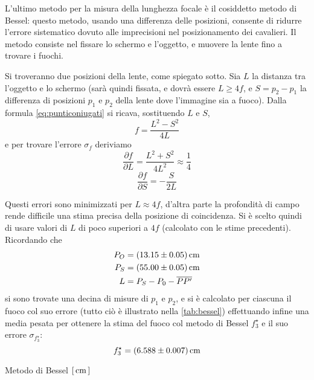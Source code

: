 L'ultimo metodo per la misura della lunghezza focale è il cosiddetto 
metodo di Bessel: questo metodo, usando una differenza delle 
posizioni, consente di ridurre l'errore sistematico dovuto alle 
imprecisioni nel posizionamento dei cavalieri. Il metodo consiste 
nel fissare lo schermo e l'oggetto, e muovere la lente fino a 
trovare i fuochi. 

Si troveranno due posizioni della lente, come spiegato sotto. Sia 
$L$ la distanza tra l'oggetto e lo schermo (sarà quindi fissata, e 
dovrà essere $L \geq 4f$, e $S=p_2-p_1$ la differenza di posizioni $p_1$ e $p_2$ della 
lente dove l'immagine sia a fuoco).  Dalla formula \eqref{eq:punticoniugati} si ricava, 
sostituendo $L$ e $S$,
\begin{equation}
f = \frac{L^2-S^2}{4L}
\end{equation}
e per trovare l'errore $\sigma_f$ deriviamo
\begin{equation*} \label{eq:dfdl}
\frac{\partial f}{\partial L} = \frac{L^2+S^2}{4L^2} \approx \frac{1}{4}
\end{equation*}
\begin{equation*}
\frac{\partial f}{\partial S} = -\frac{S}{2L}
\end{equation*}

Questi errori sono minimizzati per $L \approx 4f$, d'altra parte la 
profondità di campo rende difficile una stima precisa della 
posizione di coincidenza. Si \`e scelto quindi di usare valori di $L$ di poco 
superiori a $4f$ (calcolato con le stime precedenti). 
Ricordando che
\begin{align}
	 P_O &= (13.15 \pm 0.05)\,\mathrm{cm} \\
	 P_S &= (55.00 \pm 0.05)\,\mathrm{cm} \\
	 L &= P_S -P_0 -\overline{PP'}
\end{align}
si sono trovate una decina di misure di $p_1$ e 
$p_2$, e si \`e calcolato per ciascuna il fuoco col suo errore 
(tutto ciò è illustrato nella \autoref{tab:bessel}) effettuando 
infine una media pesata per ottenere la stima del fuoco col metodo 
di Bessel $f^{\star}_3$ e il suo errore $\sigma_{f^{\star}_3}$:
\begin{equation}
f^{\star}_3 = (6.588 \pm 0.007) \,\mathrm{cm}
\end{equation}
\begin{tabella}
	\centering
	
	\caption{Metodo di Bessel $[\,\mathrm{cm}\,]$}
	\label{tab:bessel}
\end{tabella}
